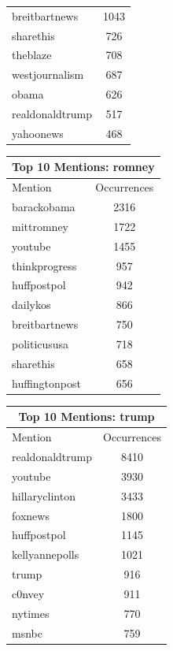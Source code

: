 \documentclass[12pt,a4paper]{report}
\begin{document}
\begin{table}[ht]
\begin{tabular}[t]{|l|c|}
      breitbartnews & 1043 \\
      sharethis & 726 \\
      theblaze & 708 \\
      westjournalism & 687 \\
      obama & 626 \\
      realdonaldtrump & 517 \\
      yahoonews & 468 \\
      \hline
    \end{tabular}\hfill%
    \begin{tabular}[t]{|l|c|}
      \hline
      \multicolumn{2}{|c|}{Top 10 Mentions: romney} \\
      \hline
      Mention & Occurrences \\ [0.5ex]
      \hline
      \hline
      barackobama & 2316 \\
      mittromney & 1722 \\
      youtube & 1455 \\
      thinkprogress & 957 \\
      huffpostpol & 942 \\
      dailykos & 866 \\
      breitbartnews & 750 \\
      politicususa & 718 \\
      sharethis & 658 \\
      huffingtonpost & 656 \\
      \hline
    \end{tabular}\hfill%
    \begin{tabular}[t]{|l|c|}
      \hline
      \multicolumn{2}{|c|}{Top 10 Mentions: trump} \\
      \hline
      Mention & Occurrences \\ [0.5ex]
      \hline
      \hline
      realdonaldtrump & 8410 \\
      youtube & 3930 \\
      hillaryclinton & 3433 \\
      foxnews & 1800 \\
      huffpostpol & 1145 \\
      kellyannepolls & 1021 \\
      trump & 916 \\
      c0nvey & 911 \\
      nytimes & 770 \\
      msnbc & 759 \\
      \hline
    \end{tabular}\hfill%

\end{table}
\end{document}
